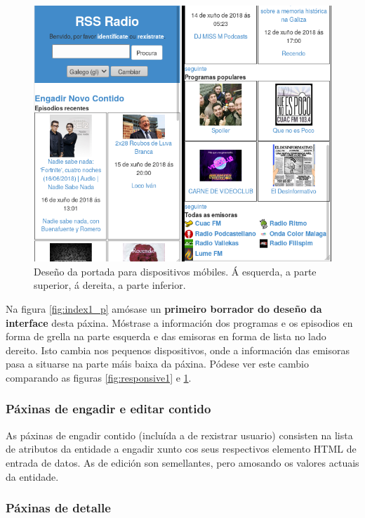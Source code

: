 \begin{figure}[H]
	\centering
	\includegraphics[scale=0.5,keepaspectratio=true]{./images/responsive2.png}
	\caption{Deseño da portada para dispositivos móbiles. Á esquerda, a parte superior, á dereita, a parte inferior.}
	\label{fig:responsive2}
\end{figure}


Na figura \ref{fig:index1_p} amósase un \textbf{primeiro borrador do deseño da interface} desta páxina. Móstrase a información dos programas e os episodios en forma de grella na parte esquerda e das emisoras en forma de lista no lado dereito. Isto cambia nos pequenos dispositivos, onde a información das emisoras pasa a situarse na parte máis baixa da páxina. Pódese ver este cambio comparando as figuras \ref{fig:responsive1} e \ref{fig:responsive2}.


\subsubsection{Páxinas de engadir e editar contido}

As páxinas de engadir contido (incluída a de rexistrar usuario) consisten na lista de atributos da entidade a engadir xunto cos seus respectivos elemento HTML de entrada de datos. As de edición son semellantes, pero amosando os valores actuais da entidade.

\subsubsection{Páxinas de detalle}

